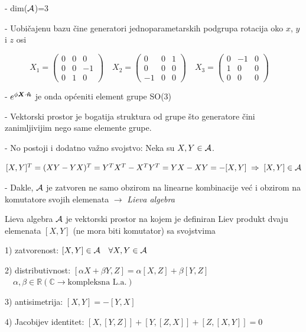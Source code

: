 - dim($\mathcal{A}$)=3

- Uobičajenu bazu čine generatori jednoparametarskih podgrupa rotacija oko
  $x$, $y$ i $z$ osi

\begin{equation}
X_1=\left(
\begin{array}{ccc}
0 & 0 & 0 \\ 
0 & 0 &-1 \\
0 & 1 & 0
\end{array} \right) \quad
X_2=\left(
\begin{array}{ccc}
0 & 0 & 1 \\ 
0 & 0 & 0 \\
-1& 0 & 0
\end{array} \right) \quad
X_3=\left(
\begin{array}{ccc}
0 & -1 & 0 \\ 
1& 0 & 0 \\
0 & 0 & 0
\end{array} \right) \quad
\label{eq:SO3generators}
\end{equation}

- $e^{\phi \vec{X}\cdot\unitn}$ je onda općeniti element grupe SO(3)

- Vektorski prostor je bogatija struktura od grupe što generatore
 čini zanimljivijim nego same elemente grupe.

- No postoji i dodatno važno svojstvo: Neka su $X,Y\in\mathcal{A}$.

$[X,Y]^T = (XY-YX)^T = Y^T X^T - X^T Y^T = YX-XY = -[X,Y] \;\Rightarrow\; [X,Y]\in\mathcal{A}$

- Dakle, $\mathcal{A}$ je zatvoren ne samo obzirom na linearne kombinacije već
   i obzirom na komutatore svojih elemenata $\to$ \emph{Lieva algebra}

\begin{definicija}
Lieva algebra $\mathcal{A}$ je vektorski prostor na kojem je definiran 
Liev produkt dvaju elemenata $[X,Y]$ (ne mora biti komutator) sa svojstvima

1) zatvorenost: $[X,Y]\in\mathcal{A} \quad \forall X,Y\in\mathcal{A}$

2) distributivnost: $[\alpha X + \beta Y, Z]=\alpha[X,Z]+\beta[Y,Z]$
$\quad \alpha,\beta \in \mathbb{R} (\mathbb{C} \to \textrm{kompleksna L.a.})$

3) antisimetrija: $[X,Y]=-[Y,X]$

4) Jacobijev identitet: $[X, [Y, Z]]+[Y, [Z, X]]+[Z, [X, Y]]=0$
\end{definicija}


